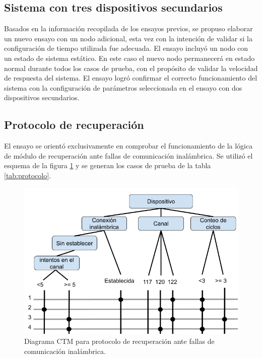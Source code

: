 \subsection{Sistema con tres dispositivos secundarios}

Basados en la información recopilada de los ensayos previos, se propuso elaborar un nuevo ensayo con un nodo adicional, esta vez con la intención de validar si la configuración de tiempo utilizada fue adecuada. El ensayo incluyó un nodo con un estado de sistema estático. En este caso el nuevo nodo permanecerá en estado normal durante todos los casos de prueba, con el propósito de validar la velocidad de respuesta del sistema. El ensayo logró confirmar el correcto funcionamiento del sistema con la configuración de parámetros seleccionada en el ensayo con dos dispositivos secundarios.

\subsection{Protocolo de recuperación}

El ensayo se orientó exclusivamente en comprobar el funcionamiento de la lógica de módulo de recuperación ante fallas de comunicación inalámbrica. Se utilizó el esquema de la figura \ref{fig:ctm_protocolo} y se generan los casos de prueba de la tabla \ref{tab:protocolo}.


\begin{figure}[ht]
	\centering
	\includegraphics[scale=.4]{./Figures/Capitulo4/CTM_PROTOCOLO.png}
	\caption{Diagrama CTM para protocolo de recuperación ante fallas de comunicación inalámbrica.}
	\label{fig:ctm_protocolo}
\end{figure}


